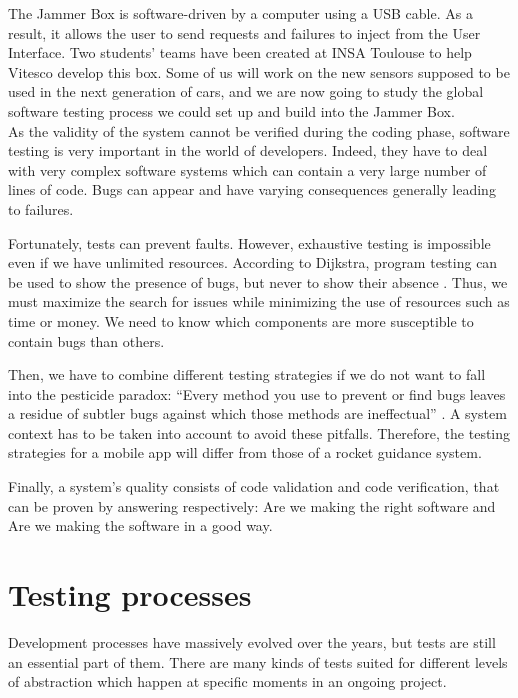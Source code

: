 The Jammer Box is software-driven by a computer using a USB cable. As a result, it allows the user to send requests and failures to inject from the User Interface.
Two students’ teams have been created at INSA Toulouse to help Vitesco develop this box. Some of us will work on the new sensors supposed to be used in the next generation of cars, and we are now going to study the global software testing process we could set up and build into the Jammer Box.
\\[1em]
As the validity of the system cannot be verified during the coding phase, software testing is very important in the world of developers. Indeed, they have to deal with very complex software systems which can contain a very large number of lines of code. Bugs can appear and have varying consequences generally leading to failures.

Fortunately, tests can prevent faults. However, exhaustive testing is impossible even if we have unlimited resources. According to Dijkstra, program testing can be used to show the presence of bugs, but never to show their absence \cite{Software_Testing}. Thus, we must maximize the search for issues while minimizing the use of resources such as time or money. We need to know which components are more susceptible to contain bugs than others.

Then, we have to combine different testing strategies if we do not want to fall into the pesticide paradox: “Every method you use to prevent or find bugs leaves a residue of subtler bugs against which those methods are ineffectual” \cite{Software_Testing}.
A system context has to be taken into account to avoid these pitfalls. Therefore, the testing strategies for a mobile app will differ from those of a rocket guidance system.

Finally, a system's quality consists of code validation and code verification, that can be proven by answering respectively: Are we making the right software and Are we making the software in a good way.\cite{Software_Testing}


\newpage

\section{Testing processes}

Development processes have massively evolved over the years, but tests are still an essential part of them. There are many kinds of tests suited for different levels of abstraction which happen at specific moments in an ongoing project.

